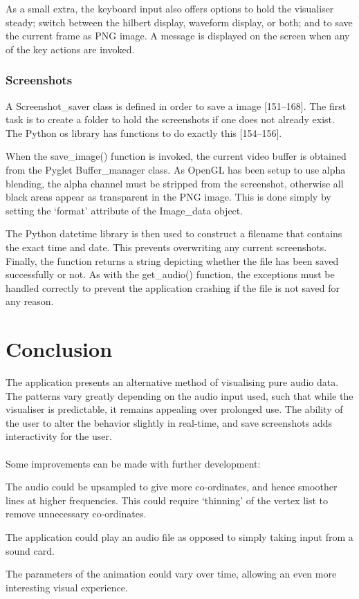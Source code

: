 \documentclass[11pt]{article}
\begin{document}
As a small extra, the keyboard input also offers options to hold the visualiser steady; switch between the hilbert display, waveform display, or both; and to save the current frame as PNG image. A message is displayed on the screen when any of the key actions are invoked.

\subsubsection{Screenshots}
A Screenshot\_saver class is defined in order to save a image [151--168]. The first task is to create a folder to hold the screenshots if one does not already exist. The Python os library has functions to do exactly this [154--156].

When the save\_image() function is invoked, the current video buffer is obtained from the Pyglet Buffer\_manager class. As OpenGL has been setup to use alpha blending, the alpha channel must be stripped from the screenshot, otherwise all black areas appear as transparent in the PNG image. This is done simply by setting the `format' attribute of the Image\_data object.

The Python datetime library is then used to construct a filename that contains the exact time and date. This prevents overwriting any current screenshots. Finally, the function returns a string depicting whether the file has been saved successfully or not. As with the get\_audio() function, the exceptions must be handled correctly to prevent the application crashing if the file is not saved for any reason.

\newpage
\section{Conclusion}
The application presents an alternative method of visualising pure audio data. The patterns vary greatly depending on the audio input used, such that while the visualiser is predictable, it remains appealing over prolonged use. The ability of the user to alter the behavior slightly in real-time, and save screenshots adds interactivity for the user.
\\ \\ Some improvements can be made with further development:
\begin{itemize*}
\item The audio could be upsampled to give more co-ordinates, and hence smoother lines at higher frequencies. This could require `thinning' of the vertex list to remove unnecessary co-ordinates.
\item The application could play an audio file as opposed to simply taking input from a sound card.
\item The parameters of the animation could vary over time, allowing an even more interesting visual experience. 
\end{itemize*}
\vspace{2cm}


\end{document}
